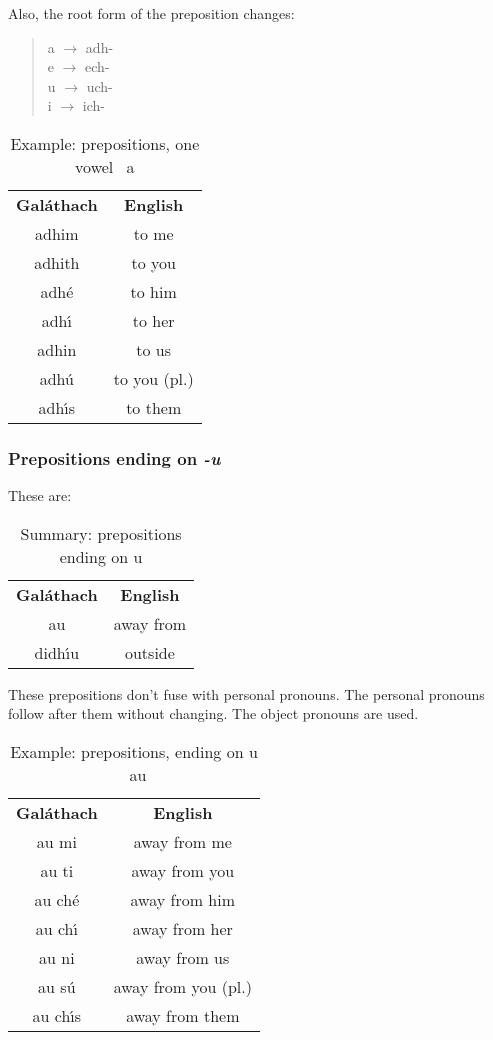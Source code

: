 Also, the root form of the preposition changes:
\begin{quote}
a $\rightarrow$ adh-\\
e $\rightarrow$ ech-\\
u $\rightarrow$ uch-\\
i $\rightarrow$ ich-
\end{quote}

\begin{table}[H]
\centering
\begin{tabular}{cc}
  \toprule
  \textbf{Gal\'{a}thach} & \textbf{English}\\
  \cmidrule(lr){1-1}\cmidrule(lr){2-2}
  adhim & to me\\
  adhith & to you\\
  adh\'{e} & to him\\
  adh\'{\i} & to her\\
  adhin & to us\\
  adh\'{u} & to you (pl.)\\
  adh\'{\i}s & to them\\
  \bottomrule
\end{tabular}
\caption{Example: prepositions, one vowel \textendash\ a}
\label{example_prepositions_one_vowel_a}
\end{table}

\subsubsection{Prepositions ending on \textit{-u}}
These are:
\begin{table}[H]
\centering
\begin{tabular}{cc}
  \toprule
  \textbf{Gal\'{a}thach} & \textbf{English}\\
  \cmidrule(lr){1-1}\cmidrule(lr){2-2}
  au & away from\\
  didh\'{\i}u & outside\\
  \bottomrule
\end{tabular}
\caption{Summary: prepositions ending on u}
\label{summary_prepositions_ending_on_u}
\end{table}

These prepositions don't fuse with personal pronouns. The personal pronouns follow after them without changing. The object pronouns are used.
\begin{table}[H]
\centering
\begin{tabular}{cc}
  \toprule
  \textbf{Gal\'{a}thach} & \textbf{English}\\
  \cmidrule(lr){1-1}\cmidrule(lr){2-2}
  au mi & away from me\\
  au ti & away from you\\
  au ch\'{e} & away from him\\
  au ch\'{\i} & away from her\\
  au ni & away from us\\
  au s\'{u} & away from you (pl.)\\
  au ch\'{\i}s & away from them\\
  \bottomrule
\end{tabular}
\caption{Example: prepositions, ending on u \textendash\ au}
\label{example_prepositions_ending_on_u_au}
\end{table}

